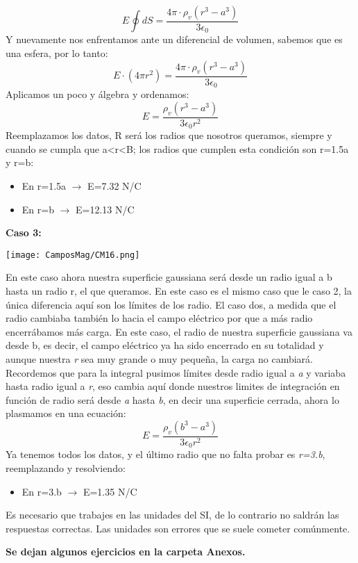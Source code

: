 \documentclass[
	12pt, %
	fleqn, %
	a4paper, %
	oneside, %
]{LegrandOrangeBook}
\begin{document}
\begin{example}
\begin{displaymath}
E\oint dS = \frac{4\pi\cdot\rho_v\left(r^3-a^3\right)}{3\epsilon_0}
\end{displaymath}
Y nuevamente nos enfrentamos ante un diferencial de volumen, sabemos que es una esfera, por lo tanto:
\begin{displaymath}
E\cdot(4\pi r^2) = \frac{4\pi\cdot\rho_v\left(r^3-a^3\right)}{3\epsilon_0}
\end{displaymath}
Aplicamos un poco y álgebra y ordenamos:
\begin{displaymath}
E=\frac{\rho_v\left(r^3-a^3\right)}{3\epsilon_0 r^2}
\end{displaymath}
Reemplazamos los datos, R será los radios que nosotros queramos, siempre y cuando se cumpla que a<r<B; los radios que cumplen esta condición son r=1.5a y r=b:
\begin{itemize}
\item En r=1.5a $\rightarrow$ E=7.32 N/C
\item En r=b $\rightarrow$ E=12.13 N/C\\
\end{itemize}
\textbf{Caso 3:}
\begin{center}
\texttt{[image: CamposMag/CM16.png]}
\end{center}
En este caso ahora nuestra superficie gaussiana será desde un radio igual a b hasta un radio r, el que queramos. En este caso es el mismo caso que le caso 2, la única diferencia aquí son los límites de los radio. El caso dos, a medida que el radio cambiaba también lo hacia el campo eléctrico por que a más radio encerrábamos más carga. En este caso, el radio de nuestra superficie gaussiana va desde b, es decir, el campo eléctrico ya ha sido encerrado en su totalidad y aunque nuestra \textit{r} sea muy grande o muy pequeña, la carga no cambiará. Recordemos que para la integral pusimos límites desde radio igual a \textit{a} y variaba hasta radio igual a  \textit{r}, eso cambia aquí donde nuestros limites de integración en función de radio será desde \textit{a} hasta \textit{b}, en decir una superficie cerrada, ahora lo plasmamos en una ecuación:
\begin{displaymath}
E=\frac{\rho_v\left(b^3-a^3\right)}{3\epsilon_0 r^2}
\end{displaymath}
Ya tenemos todos los datos, y el último radio que no falta probar es \textit{r=3.b}, reemplazando y resolviendo:
\begin{itemize}
\item En r=3.b $\rightarrow$ E=1.35 N/C
\end{itemize}

\end{example}
\begin{remark}
Es necesario que trabajes en las unidades del SI, de lo contrario no saldrán las respuestas correctas. Las unidades son errores que se suele cometer comúnmente.
\end{remark}
\textbf{Se dejan algunos ejercicios en la carpeta Anexos.}\\
\end{document}
